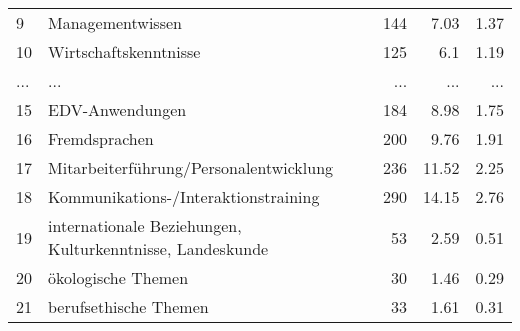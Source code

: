 \begin{longtable}{lXrrr}
        9 & \multicolumn{1}{X}{Managementwissen} & %
          \num{144} &
          \num[round-mode=places,round-precision=2]{7.03} &
          \num[round-mode=places,round-precision=2]{1.37} \\
        10 & \multicolumn{1}{X}{Wirtschaftskenntnisse} & %
          \num{125} &
          \num[round-mode=places,round-precision=2]{6.1} &
          \num[round-mode=places,round-precision=2]{1.19} \\
       ... & ... & ... & ... & ... \\
        15 & \multicolumn{1}{X}{EDV-Anwendungen} & %
          \num{184} &
          \num[round-mode=places,round-precision=2]{8.98} &
          \num[round-mode=places,round-precision=2]{1.75} \\

        16 & \multicolumn{1}{X}{Fremdsprachen} & %
          \num{200} &
          \num[round-mode=places,round-precision=2]{9.76} &
          \num[round-mode=places,round-precision=2]{1.91} \\

        17 & \multicolumn{1}{X}{Mitarbeiterführung/Personalentwicklung} & %
          \num{236} &
          \num[round-mode=places,round-precision=2]{11.52} &
          \num[round-mode=places,round-precision=2]{2.25} \\

        18 & \multicolumn{1}{X}{Kommunikations-/Interaktionstraining} & %
          \num{290} &
          \num[round-mode=places,round-precision=2]{14.15} &
          \num[round-mode=places,round-precision=2]{2.76} \\

        19 & \multicolumn{1}{X}{internationale Beziehungen, Kulturkenntnisse, Landeskunde} & %
          \num{53} &
          \num[round-mode=places,round-precision=2]{2.59} &
          \num[round-mode=places,round-precision=2]{0.51} \\

        20 & \multicolumn{1}{X}{ökologische Themen} & %
          \num{30} &
          \num[round-mode=places,round-precision=2]{1.46} &
          \num[round-mode=places,round-precision=2]{0.29} \\

        21 & \multicolumn{1}{X}{berufsethische Themen} & %
          \num{33} &
          \num[round-mode=places,round-precision=2]{1.61} &
          \num[round-mode=places,round-precision=2]{0.31} \\


\end{longtable}
